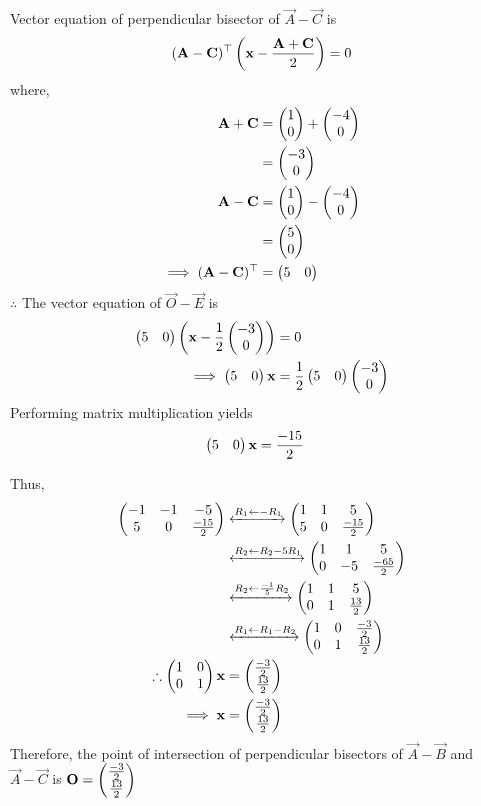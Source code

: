 \documentclass[11pt]{book}
\begin{document}
\begin{enumerate}[label=\thesection.\arabic*.,ref=\thesection.\theenumi]
Vector equation of perpendicular bisector of $\vec{A}-\vec{C}$ is
\begin{align}
(\mathbf{A}-\mathbf{C})^\top\left( \mathbf{x} - \frac{\mathbf{A}+\mathbf{C}}{2}\right) = 0
\end{align}
where,
\begin{align}
\mathbf{A}+\mathbf{C}&=\begin{pmatrix}1\\0\end{pmatrix}+\begin{pmatrix}-4\\0\end{pmatrix}\\
&=\begin{pmatrix}-3\\0\end{pmatrix}\\
\mathbf{A}-\mathbf{C} &= \begin{pmatrix}1\\0\end{pmatrix}-\begin{pmatrix}-4\\0\end{pmatrix}\\
&=\begin{pmatrix}5\\0\end{pmatrix}\\
\implies (\mathbf{A}-\mathbf{C})^\top &= \begin{pmatrix}5&0\end{pmatrix}
\end{align}
$\therefore $ The vector equation of $\vec{O}-\vec{E}$ is
\begin{align}
\begin{pmatrix}5&0\end{pmatrix}\left( \mathbf{x}-\frac{1}{2}\begin{pmatrix}-3\\0\end{pmatrix}\right)&=0\\
\implies \begin{pmatrix}5&0\end{pmatrix}\mathbf{x}&=\frac{1}{2}\begin{pmatrix}5&0\end{pmatrix}\begin{pmatrix}-3\\0\end{pmatrix}
\end{align}
Performing matrix multiplication yields
\begin{align}
\begin{pmatrix}5&0\end{pmatrix}\mathbf{x}&=\frac{-15}{2}
\end{align}

Thus,
\begin{align}
\begin{pmatrix}-1&-1&-5\\5&0&\frac{-15}{2}\end{pmatrix} &\xleftrightarrow[]{R_1 \leftarrow   - R_1} \begin{pmatrix}1&1&5\\5&0&\frac{-15}{2}\end{pmatrix}\\ &\xleftrightarrow[]{R_2\leftarrow R_2 - 5 R_1}
\begin{pmatrix}1&1& 5\\0&-5&\frac{-65}{2}\end{pmatrix}\\
 &\xleftrightarrow[]{R_2 \leftarrow \frac{-1}{5}R_2} \begin{pmatrix}1&1&5 \\0&1&\frac{13}{2}\end{pmatrix}\\ 
 &\xleftrightarrow[]{R_1 \leftarrow R_1 - R_2} \begin{pmatrix}1&0&\frac{-3}{2} \\0&1&\frac{13}{2}\end{pmatrix}\\
\therefore \begin{pmatrix}1&0\\0&1\end{pmatrix}\mathbf{x} &= \begin{pmatrix}\frac{-3}{2}\\\frac{13}{2}\end{pmatrix}\\
\implies \mathbf{x}&=\begin{pmatrix}\frac{-3}{2}\\\frac{13}{2}\end{pmatrix}
\end{align}
Therefore, the point of intersection of perpendicular bisectors of $\vec{A}-\vec{B}$ and $\vec{A}-\vec{C}$ is $\mathbf{O} = \begin{pmatrix}\frac{-3}{2}\\ \frac{13}{2}\end{pmatrix}$


\end{enumerate}
\end{document}
